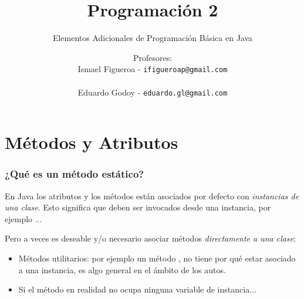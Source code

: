 \documentclass{beamer}
\title[\textbf{Programación 2}]{\textbf{Programación 2}}
\subtitle{Elementos Adicionales de Programación Básica en Java}
\author[IF-EG]
{Profesores:\\
  Ismael Figueroa -  \texttt{\small ifigueroap@gmail.com} \\
  \vspace{0.5mm} \\
  Eduardo Godoy - \texttt{\small eduardo.gl@gmail.com}
}
\institute[Universidad de Valparaíso]
\date{}
\begin{document}
\begin{frame}
  \titlepage
\end{frame}

\section{Métodos y Atributos }

\begin{frame}
  \frametitle{¿Qué es un método estático?}

  \begin{block}{}
    En Java los atributos y los métodos están asociados por defecto
    con \emph{instancias de una clase}. Esto significa que deben ser
    invocados desde una instancia, por ejemplo
     ...
  \end{block}

  Pero a veces es deseable y/o necesario asociar métodos \emph{directamente a una clase}:

  \begin{itemize}
    
  \item Métodos utilitarios: por ejemplo un método , no tiene por
    qué estar asociado a una instancia, es algo general en el ámbito
    de los autos.
    
  \item Si el método en realidad no ocupa ninguna variable de
    instancia...
    
  \end{itemize}

\end{frame}
\end{document}
